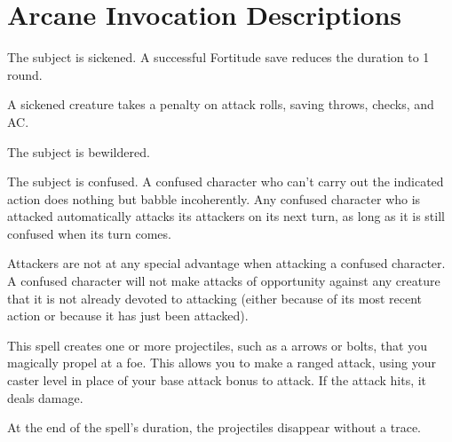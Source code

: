 \section{Arcane Invocation Descriptions}

\spellrng{\rngclose}
\begin{spelleffect}
The subject is sickened. A successful Fortitude save reduces the duration to 1 round.
\end{spelleffect}
\begin{spellnotes}
A sickened creature takes a  penalty on attack rolls, saving throws, checks, and AC.
\end{spellnotes}

\begin{spellhealthy}
The subject is bewildered.
\end{spellhealthy}
\begin{spellblood}
The subject is confused. \confusionexplanation A confused character who can't carry out the indicated action does nothing but babble incoherently. Any confused character who is attacked automatically attacks its attackers on its next turn, as long as it is still confused when its turn comes.
\end{spellblood}
\begin{spellnotes}
\par Attackers are not at any special advantage when attacking a confused character. A confused character will not make attacks of opportunity against any creature that it is not already devoted to attacking (either because of its most recent action or because it has just been attacked).
\end{spellnotes}

\spellrng{\rngmed}
\begin{spelleffect}
This spell creates one or more projectiles, such as a arrows or bolts, that you magically propel at a foe. This allows you to make a ranged attack, using your caster level in place of your base attack bonus to attack. If the attack hits, it deals damage.
\end{spelleffect}
\begin{spellnotes}
\par At the end of the spell's duration, the projectiles disappear without a trace.
\end{spellnotes}

